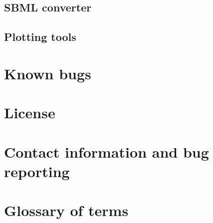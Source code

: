 \documentclass[11pt,letterpaper]{article}
\newcommand\backmatter{%
    \clearpage %
  }
\begin{document}
\subsection{SBML converter}
\subsection{Plotting tools}

\section{Known bugs}

\section{License}

\section{Contact information and bug reporting}

\section{Glossary of terms}









\backmatter
{\singlespace

%
}
\end{document}

